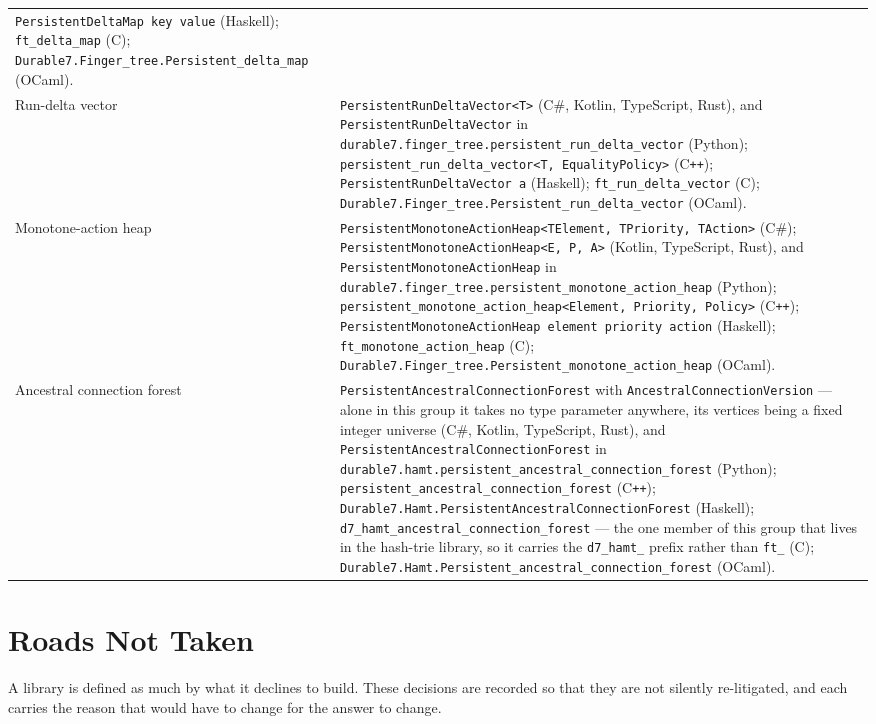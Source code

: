 \documentclass[11pt,twoside,openright]{book}
\makeatletter
\newcommand{\code}[1]{\texorpdfstring{\textcolor{d7ink}{\texttt{#1}}}{#1}}
\newenvironment{d7table}[1]
  {\par\vspace{3pt}\small
   \setlength{\LTpre}{4pt}\setlength{\LTpost}{4pt}
   \begin{longtable}{@{}%
     >{\raggedright\arraybackslash}p{#1\textwidth}%
     @{\hspace{10pt}}%
     >{\raggedright\arraybackslash}p{\dimexpr\textwidth-#1\textwidth-10pt\relax}@{}}}
  {\end{longtable}}
\makeatother
\begin{document}
\begin{d7table}{0.26}
\code{PersistentDeltaMap key value} (Haskell);
\code{ft\_delta\_map} (C);
\code{Durable7.Finger\_tree.Persistent\_delta\_map} (OCaml). \\
Run-delta vector &
\code{PersistentRunDeltaVector<T>} (C\#, Kotlin, TypeScript, Rust), and
\code{PersistentRunDeltaVector} in
\code{durable7.finger\_tree.persistent\_run\_delta\_vector} (Python);
\code{persistent\_run\_delta\_vector<T, EqualityPolicy>} (C\texttt{++});
\code{PersistentRunDeltaVector a} (Haskell);
\code{ft\_run\_delta\_vector} (C);
\code{Durable7.Finger\_tree.Persistent\_run\_delta\_vector} (OCaml). \\
Monotone-action heap &
\code{PersistentMonotoneActionHeap<TElement, TPriority, TAction>} (C\#);
\code{PersistentMonotoneActionHeap<E, P, A>} (Kotlin, TypeScript, Rust), and
\code{PersistentMonotoneActionHeap} in
\code{durable7.finger\_tree.persistent\_monotone\_action\_heap} (Python);
\code{persistent\_monotone\_action\_heap<Element, Priority, Policy>}
(C\texttt{++});
\code{PersistentMonotoneActionHeap element priority action} (Haskell);
\code{ft\_monotone\_action\_heap} (C);
\code{Durable7.Finger\_tree.Persistent\_monotone\_action\_heap} (OCaml). \\
Ancestral connection forest &
\code{PersistentAncestralConnectionForest} with
\code{AncestralConnectionVersion} --- alone in this group it takes no type
parameter anywhere, its vertices being a fixed integer universe (C\#, Kotlin,
TypeScript, Rust), and
\code{PersistentAncestralConnectionForest} in
\code{durable7.hamt.persistent\_ancestral\_connection\_forest} (Python);
\code{persistent\_ancestral\_connection\_forest} (C\texttt{++});
\code{Durable7.Hamt.PersistentAncestralConnectionForest} (Haskell);
\code{d7\_hamt\_ancestral\_connection\_forest} --- the one member of this group
that lives in the hash-trie library, so it carries the \code{d7\_hamt\_} prefix
rather than \code{ft\_} (C);
\code{Durable7.Hamt.Persistent\_ancestral\_connection\_forest} (OCaml). \\
\bottomrule
\end{d7table}

\chapter{Roads Not Taken}
\label{app:roads}

\noindent
A library is defined as much by what it declines to build. These decisions are
recorded so that they are not silently re-litigated, and each carries the reason
that would have to change for the answer to change.
\end{document}
